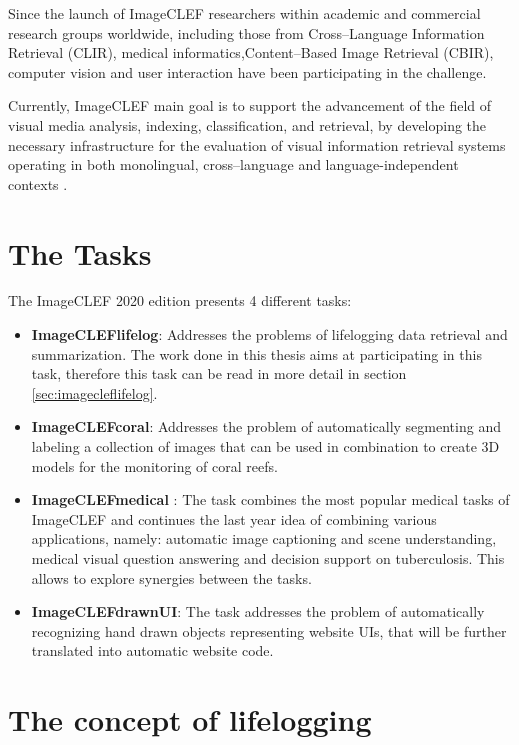 Since the launch of ImageCLEF  researchers within academic and commercial research groups worldwide, including those from Cross–Language Information Retrieval (CLIR), medical informatics,Content–Based Image Retrieval (CBIR), computer vision and user interaction have been participating in the challenge. 

Currently, ImageCLEF main goal is to support the advancement of the field of visual media analysis, indexing, classification, and retrieval, by developing the necessary infrastructure for the evaluation of visual information retrieval systems operating in both monolingual, cross–language and language-independent contexts \cite{Zhang2008}. 


\newpage
\section{The Tasks}
\label{sec:tasks}

The ImageCLEF 2020 edition presents 4 different tasks:
    \begin{itemize}
    \item \textbf{ImageCLEFlifelog}: Addresses the problems of lifelogging data retrieval and summarization. The work done in this thesis aims at participating in this task, therefore this task can be read in more detail in section \ref{sec:imagecleflifelog}.
    
    \item \textbf{ImageCLEFcoral}: Addresses the problem of automatically segmenting and labeling a collection of images that can be used in combination to create 3D models for the monitoring of coral reefs.
    
    \item \textbf{ImageCLEFmedical} :  The task combines the most popular medical tasks of ImageCLEF and continues the last year idea of combining various applications, namely: automatic image captioning and scene understanding, medical visual question answering and decision support on tuberculosis. This allows to explore synergies between the tasks.
    
    \item \textbf{ImageCLEFdrawnUI}:  The task addresses the problem of automatically recognizing hand drawn objects representing website UIs, that will be further translated into automatic website code.
    \end{itemize}


\section{The concept of lifelogging}
\label{sec:concept_lifelog}

